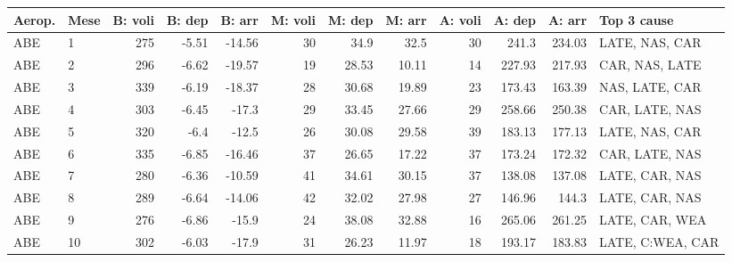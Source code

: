 \begin{tabular}{@{}l l rrrrrrrrr l@{}}
\toprule
Aerop. & Mese & B: voli & B: dep & B: arr & M: voli & M: dep & M: arr & A: voli & A: dep & A: arr & Top 3 cause \\
\midrule
ABE & 1 & 275 & -5.51 & -14.56 & 30 & 34.9 & 32.5 & 30 & 241.3 & 234.03 & LATE, NAS, CAR \\
ABE & 2 & 296 & -6.62 & -19.57 & 19 & 28.53 & 10.11 & 14 & 227.93 & 217.93 & CAR, NAS, LATE \\
ABE & 3 & 339 & -6.19 & -18.37 & 28 & 30.68 & 19.89 & 23 & 173.43 & 163.39 & NAS, LATE, CAR \\
ABE & 4 & 303 & -6.45 & -17.3 & 29 & 33.45 & 27.66 & 29 & 258.66 & 250.38 & CAR, LATE, NAS \\
ABE & 5 & 320 & -6.4 & -12.5 & 26 & 30.08 & 29.58 & 39 & 183.13 & 177.13 & LATE, NAS, CAR \\
ABE & 6 & 335 & -6.85 & -16.46 & 37 & 26.65 & 17.22 & 37 & 173.24 & 172.32 & CAR, LATE, NAS \\
ABE & 7 & 280 & -6.36 & -10.59 & 41 & 34.61 & 30.15 & 37 & 138.08 & 137.08 & LATE, CAR, NAS \\
ABE & 8 & 289 & -6.64 & -14.06 & 42 & 32.02 & 27.98 & 27 & 146.96 & 144.3 & LATE, CAR, NAS \\
ABE & 9 & 276 & -6.86 & -15.9 & 24 & 38.08 & 32.88 & 16 & 265.06 & 261.25 & LATE, CAR, WEA \\
ABE & 10 & 302 & -6.03 & -17.9 & 31 & 26.23 & 11.97 & 18 & 193.17 & 183.83 & LATE, C:WEA, CAR \\
\bottomrule
\end{tabular}